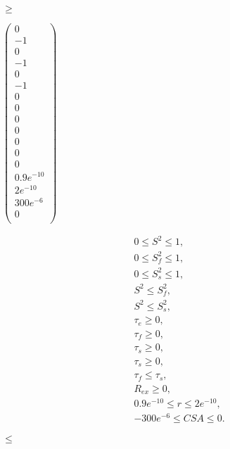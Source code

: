 \documentclass[a4paper,11pt,twoside,openright]{book}
\def\lthtmlcheckvsize{\ifdim\ht\sizebox<\vsize 
  \ifdim\wd\sizebox<\hsize\expandafter\hfill\fi \expandafter\vfill
  \else\expandafter\vss\fi}%
\begin{document}
{\newpage\clearpage
{}%
$\displaystyle \geqslant$%
\lthtmlindisplaymathZ
\lthtmlcheckvsize\clearpage}

{\newpage\clearpage
{}%
$\displaystyle \begin{pmatrix}
0 \\
-1 \\
0 \\
-1 \\
0 \\
-1 \\
0 \\
0 \\
0 \\
0 \\
0 \\
0 \\
0 \\
0.9e^{-10} \\
2e^{-10} \\
300e^{-6} \\
0 \\
\end{pmatrix}$%
\lthtmlindisplaymathZ
\lthtmlcheckvsize\clearpage}

{\newpage\clearpage
\setcounter{equation}{24}
%
\begin{subequations}\begin{gather}
0 \leqslant S^2 \leqslant 1, \\
0 \leqslant S^2_f \leqslant 1, \\
0 \leqslant S^2_s \leqslant 1, \\
S^2 \leqslant S^2_f, \\
S^2 \leqslant S^2_s, \\
\tau_e \geqslant 0, \\
\tau_f \geqslant 0, \\
\tau_s \geqslant 0, \\
\tau_s \geqslant 0, \\
\tau_f \leqslant \tau_s, \\
R_{ex} \geqslant 0, \\
0.9e^{-10} \leqslant r \leqslant 2e^{-10}, \\
-300e^{-6} \leqslant CSA \leqslant 0.
\end{gather}\end{subequations}%
\lthtmldisplayZ
\lthtmlcheckvsize\clearpage}

{\newpage\clearpage
{}%
$ \leqslant$%
\lthtmlindisplaymathZ
\lthtmlcheckvsize\clearpage}
\end{document}
